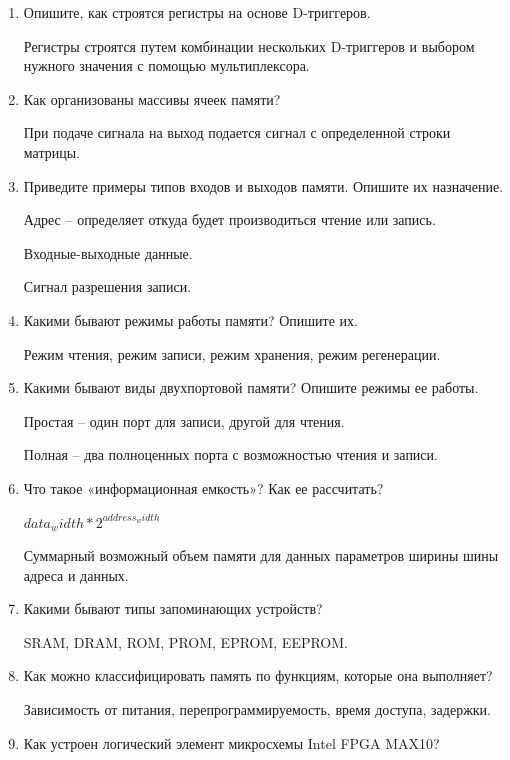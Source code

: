 \documentclass[a4paper,14pt]{article}
\begin{document}
	\begin{enumerate}
		\item Опишите, как строятся регистры на основе D-триггеров.
		
		Регистры строятся путем комбинации нескольких D-триггеров и выбором нужного значения с помощью мультиплексора.
		
		\item Как организованы массивы ячеек памяти?
		
		При подаче сигнала на выход подается сигнал с определенной строки матрицы.
		
		\item Приведите примеры типов входов и выходов памяти. Опишите их назначение.
		
		Адрес -- определяет откуда будет производиться чтение или запись.
		
		Входные-выходные данные.
		
		Сигнал разрешения записи.
		
		\item Какими бывают режимы работы памяти? Опишите их.
		
		Режим чтения, режим записи, режим хранения, режим регенерации.
		
		\item Какими бывают виды двухпортовой памяти? Опишите режимы ее работы.
		
		Простая -- один порт для записи, другой для чтения.
		
		Полная -- два полноценных порта с возможностью чтения и записи.
		
		\item Что такое «информационная емкость»? Как ее рассчитать?
		
		$ data_width * 2 ^ {address_width} $
		
		Суммарный возможный объем памяти для данных параметров ширины шины адреса и данных.
		
		\item Какими бывают типы запоминающих устройств?
		
		SRAM, DRAM, ROM, PROM, EPROM, EEPROM.
		
		\item Как можно классифицировать память по функциям, которые она выполняет?
		
		Зависимость от питания, перепрограммируемость, время доступа, задержки.
		
		\item Как устроен логический элемент микросхемы Intel FPGA MAX10?
		

\end{enumerate}
\end{document}
